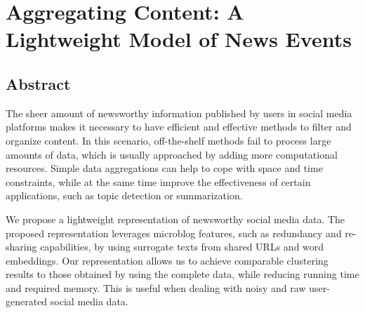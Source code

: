 \chapter{Aggregating Content: A Lightweight Model of News Events}
\label{chapter:url}

\section*{Abstract}
  The sheer amount of newsworthy information published by users in social media
  platforms makes it necessary to have efficient and effective methods to filter
  and organize content. 
  In this scenario, off-the-shelf methods fail to process large amounts of data,
  which is usually approached by adding more computational resources. 
  Simple data aggregations can help to cope with space and time constraints,
  while at the same time improve the effectiveness of certain applications, such
  as topic detection or summarization. 


  We propose a lightweight representation of newsworthy social media data. 
  The proposed representation leverages microblog features, such as redundancy
  and re-sharing capabilities, by using surrogate texts from shared URLs and word embeddings.
  Our representation allows us to achieve comparable clustering results to 
  those obtained by using the complete data, while reducing running time and 
  required memory.
  This is useful when dealing with noisy and raw user-generated social media data.










